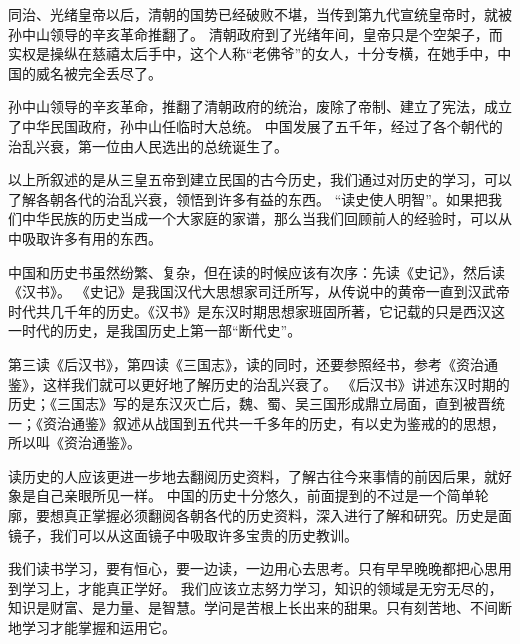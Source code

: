 \documentclass[avery5371,grid]{flashcards}
\begin{document}
{同治、光绪皇帝以后，清朝的国势已经破败不堪，当传到第九代宣统皇帝时，就被孙中山领导的辛亥革命推翻了。} %
{清朝政府到了光绪年间，皇帝只是个空架子，而实权是操纵在慈禧太后手中，这个人称“老佛爷”的女人，十分专横，在她手中，中国的威名被完全丢尽了。} %

{孙中山领导的辛亥革命，推翻了清朝政府的统治，废除了帝制、建立了宪法，成立了中华民国政府，孙中山任临时大总统。} %
{中国发展了五千年，经过了各个朝代的治乱兴衰，第一位由人民选出的总统诞生了。} %


{以上所叙述的是从三皇五帝到建立民国的古今历史，我们通过对历史的学习，可以了解各朝各代的治乱兴衰，领悟到许多有益的东西。} %
{“读史使人明智”。如果把我们中华民族的历史当成一个大家庭的家谱，那么当我们回顾前人的经验时，可以从中吸取许多有用的东西。} %


{中国和历史书虽然纷繁、复杂，但在读的时候应该有次序：先读《史记》，然后读《汉书》。} %
{《史记》是我国汉代大思想家司迁所写，从传说中的黄帝一直到汉武帝时代共几千年的历史。《汉书》是东汉时期思想家班固所著，它记载的只是西汉这一时代的历史，是我国历史上第一部“断代史”。} %

{第三读《后汉书》，第四读《三国志》，读的同时，还要参照经书，参考《资治通鉴》，这样我们就可以更好地了解历史的治乱兴衰了。} %
{《后汉书》讲述东汉时期的历史；《三国志》写的是东汉灭亡后，魏、蜀、吴三国形成鼎立局面，直到被晋统一；《资治通鉴》叙述从战国到五代共一千多年的历史，有以史为鉴戒的的思想，所以叫《资治通鉴》。} %

{读历史的人应该更进一步地去翻阅历史资料，了解古往今来事情的前因后果，就好象是自己亲眼所见一样。} %
{中国的历史十分悠久，前面提到的不过是一个简单轮廓，要想真正掌握必须翻阅各朝各代的历史资料，深入进行了解和研究。历史是面镜子，我们可以从这面镜子中吸取许多宝贵的历史教训。} %

{我们读书学习，要有恒心，要一边读，一边用心去思考。只有早早晚晚都把心思用到学习上，才能真正学好。} %
{我们应该立志努力学习，知识的领域是无穷无尽的，知识是财富、是力量、是智慧。学问是苦根上长出来的甜果。只有刻苦地、不间断地学习才能掌握和运用它。} %
\end{document}
